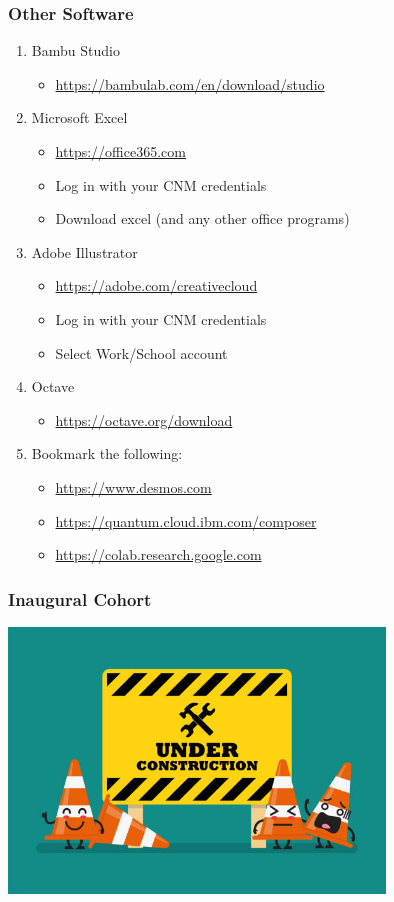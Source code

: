 \documentclass{beamer}
\begin{document}
\begin{frame}\frametitle{Other Software}
\begin{enumerate}
\item Bambu Studio
	\begin{itemize}
	\item \url{https://bambulab.com/en/download/studio}
	\end{itemize}
\item Microsoft Excel
	\begin{itemize}
	\item \url{https://office365.com}
	\item Log in with your CNM credentials
	\item Download excel (and any other office programs) 
	\end{itemize}
\item Adobe Illustrator 
	\begin{itemize}
	\item \url{https://adobe.com/creativecloud}
	\item Log in with your CNM credentials
	\item Select Work/School account 
	\end{itemize}
\item Octave
	\begin{itemize}
	\item \url{https://octave.org/download}
	\end{itemize}
\item Bookmark the following: 
	\begin{itemize}
	\item \url{https://www.desmos.com}
	\item \url{https://quantum.cloud.ibm.com/composer}
	\item \url{https://colab.research.google.com}
	\end{itemize}
\end{enumerate}
\end{frame}

\begin{frame}\frametitle{Inaugural Cohort}
\begin{center}
\includegraphics[width=10cm]{fig/underconstruction.jpg}
\end{center}
\end{frame}
\end{document}
